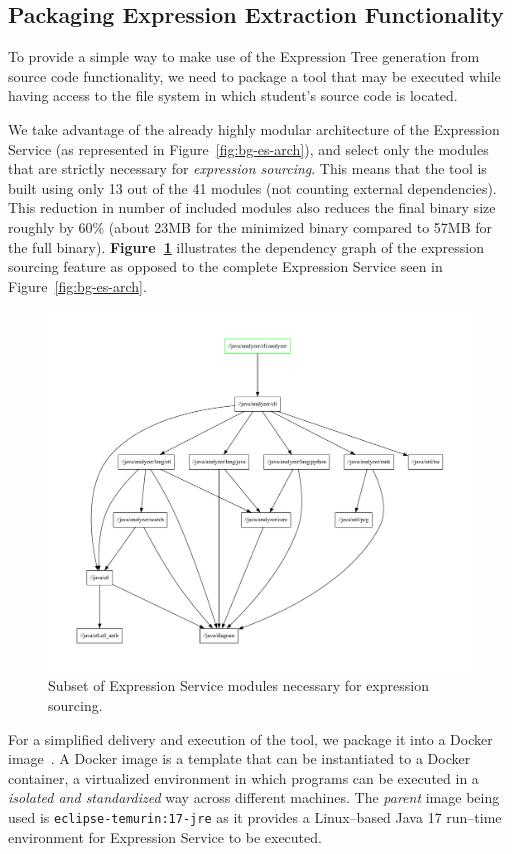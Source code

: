 \begin{chapterBody}
\subsection{Packaging Expression Extraction Functionality}\label{sec:impl-aag-pkg}

To provide a simple way to make use of the Expression Tree generation
from source code functionality, we need to package a tool that may be
executed while having access to the file system in which student's source code
is located.

We take advantage of the already highly modular architecture of the
Expression Service (as represented in Figure~\ref{fig:bg-es-arch}), and
select only the modules that are strictly necessary for \textit{expression
sourcing}. This means that the tool is built using only 13 out of the 41 modules
(not counting external dependencies). This reduction in number of included
modules also reduces the final binary size roughly by 60\% (about 23MB for the
minimized binary compared to 57MB for the full binary).
\textbf{Figure~\ref{fig:impl-di-modules}} illustrates the dependency graph
of the expression sourcing feature as opposed to the complete Expression Service
seen in Figure~\ref{fig:bg-es-arch}.

\begin{figure}[ht]
    \centering
    \includegraphics[width=0.6\linewidth]{res/6/expr_serv_analyzer_dep_graph.pdf}
    \caption{Subset of Expression Service modules necessary for expression
sourcing.}
    \label{fig:impl-di-modules}
\end{figure}

For a simplified delivery and execution of the tool, we package it into
a Docker image~\cite{docker_inc_docker_2022}. A Docker image is a template that
can be instantiated to a Docker container, a virtualized environment in which
programs can be executed in a \textit{isolated and standardized} way across
different machines.
The \textit{parent} image being used is \texttt{eclipse-temurin:17-jre} as it
provides a Linux–based Java 17 run–time environment for Expression Service to
be executed.


\end{chapterBody}
